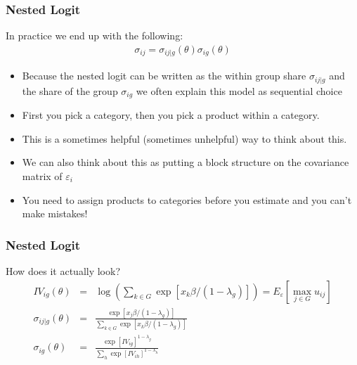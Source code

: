\documentclass[aspectratio=169,11pt]{beamer}
\begin{document}
\begin{frame}
\frametitle{Nested Logit}
In practice we end up with the following:
\begin{eqnarray*}
\sigma_{ij} = \sigma_{ij|g}(\theta) \sigma_{ig}(\theta)
\end{eqnarray*}
\begin{itemize}
\item Because the nested logit can be written as the within group share $\sigma_{ij|g}$ and the share of the group $\sigma_{ig}$ we often explain this model as \alert{sequential choice}
\item First you pick a category, then you pick a product within a category.
\item This is a sometimes helpful (sometimes unhelpful) way to think about this.
\item We can also think about this as putting a block structure on the covariance matrix of $\varepsilon_i$
\item You need to assign products to categories \alert{before you estimate} and you can't make mistakes!
\end{itemize}
\end{frame}

\begin{frame}
\frametitle{Nested Logit}
How does it actually look?
\begin{eqnarray*}
 IV_{ig}(\theta) &=& \log \left(\sum_{k \in G} \exp [x_k \beta/(1-\lambda_g)] \right) = E_{\varepsilon}[\max_{j \in G} u_{ij}]\\
 \sigma_{ij|g}(\theta) &=& \frac{\exp [x_j \beta/(1-\lambda_g)]}{\sum_{k \in G} \exp [x_k \beta/(1-\lambda_g)]} \\
 \sigma_{ig}(\theta) &=& \frac{\exp [IV_{ig}]^{1-\lambda_g}}{\sum_{h} \exp [IV_{ih}]^{1-\lambda_h}} 
\end{eqnarray*}
\end{frame}
\end{document}
